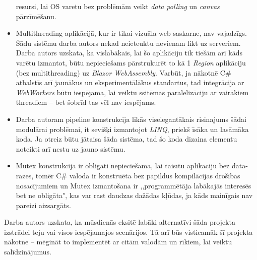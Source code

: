\begin{itemize}
    resursi, lai OS varetu bez problēmām veikt \emph{data polling} un \emph{canvas}
    pārzīmēšanu.
    \item Multithreading aplikācijā, kur ir tikai vizuāla web saskarne, nav vajadzīgs.
    Šādu sistēmu darba autors nekad neieteuktu nevienam likt uz serveriem.
    Darba autors uzskata, ka vislabākais, lai šo aplikāciju tik tiešām arī kāds
    varētu izmantot, būtu nepieciešams pārstrukurēt to kā 1 \emph{Region} aplikāciju
    (bez multithreading) uz \emph{Blazor WebAssembly}. Varbūt, ja nākotnē C\#
    atbalstīs arī jaunākus un eksperimentālākus standartus, tad integrācija ar
    \emph{WebWorkers} būtu iespējama, lai veiktu ssitēmas paralelizāciju ar vairākiem
    threadiem -- bet šobrīd tas vēl nav iespējams.
    \item Darba autoram pipeline konstrukcija likās viselegantākais risinajums
    šādai modulārai problēmai, it sevišķi izmantojot \emph{LINQ}, priekš īsāka un lasāmāka
    koda. Ja otreiz būtu jātaisa šāda sistēma, tad šo koda
    dizaina elementu noteikti arī nestu uz jauno sistēmu.
    \item Mutex konstrukcija ir obligāti nepieciešama, lai taisītu aplikāciju
    bez data-razes, tomēr C\# valoda ir konstruēta bez papildus kompilācijas
    drošības nosacījumiem un Mutex izmantošana ir ,,programmētāja labākajās
    interesēs bet ne obligāta", kas var rast daudzas dažādas kļūdas, ja kāds mainīgais
    nav pareizi aizsargāts.
\end{itemize}

Darba autors uzskata, ka mūsdienās eksitē labāki alternatīvi šāda projekta
izstrādei teju vai visos iespējamajos scenārijos. Tā arī būs visticamāk šī
projekta nākotne -- mēgināt to implementēt ar citām valodām un rīkiem, lai veiktu
salīdzinājumus.
